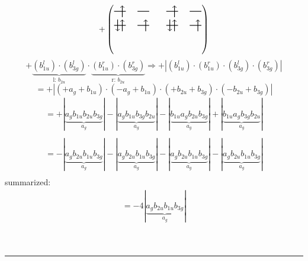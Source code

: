 \documentclass{article}
\begin{document}
\[+\left(\begin{tikzpicture}
    \draw[thick] (0,0) -- (0.5,0); %
    \draw[thick] (1,0) -- (1.5,0); %
    \draw[thick] (0,-0.6) -- (0.5,-0.6); %
    \draw[thick] (1,-0.6) -- (1.5,-0.6); %
\draw[->, thick] (0.35, -0.25) -- (0.35, 0.25); 
\draw[-> , thick] (0.35, -0.85) -- (0.35, -0.35); 
\draw[<- , thick] (0.15, -0.85) -- (0.15, -0.35); 
 \draw[-> , thick] (1.35, -0.85) -- (1.35, -0.35); 
\end{tikzpicture}\qquad \begin{tikzpicture}
    \draw[thick] (0,0) -- (0.5,0); %
    \draw[thick] (1,0) -- (1.5,0); %
    \draw[thick] (0,-0.6) -- (0.5,-0.6); %
    \draw[thick] (1,-0.6) -- (1.5,-0.6); %
\draw[->, thick] (0.35, -0.25) -- (0.35, 0.25); 
\draw[-> , thick] (0.35, -0.85) -- (0.35, -0.35); 
\draw[<- , thick] (0.15, -0.85) -- (0.15, -0.35); 
 \draw[-> , thick] (1.35, -0.85) -- (1.35, -0.35); 
\end{tikzpicture}\right)\]$$+ \underbrace{(b_{1u}^{l})\cdot (b_{3g}^{l})}_{\text{l: }b_{2u}}\cdot \underbrace{(b_{1u}^{r})\cdot (b_{3g}^{r})}_{\text{r: }b_{2u}}\Rightarrow +\left|(b_{1u}^{l}) \cdot (b_{1u}^{r}) \cdot (b_{3g}^{l}) \cdot (b_{3g}^{r})\right|$$$$=+\left|(+a_{g}+b_{1u}) \cdot (-a_{g}+b_{1u}) \cdot (+b_{2u}+b_{3g}) \cdot (-b_{2u}+b_{3g})\right|$$\begin{multline*}
=+\left|\underbrace{a_{g} b_{1u} b_{2u} b_{3g}}_{a_{g}}\right|-\left|\underbrace{a_{g} b_{1u} b_{3g} b_{2u}}_{a_{g}}\right|-\left|\underbrace{b_{1u} a_{g} b_{2u} b_{3g}}_{a_{g}}\right|+\left|\underbrace{b_{1u} a_{g} b_{3g} b_{2u}}_{a_{g}}\right|\\
\end{multline*}\begin{multline*}
=-\left|\underbrace{a_{g} b_{2u} b_{1u} b_{3g}}_{a_{g}}\right|-\left|\underbrace{a_{g} b_{2u} b_{1u} b_{3g}}_{a_{g}}\right|-\left|\underbrace{a_{g} b_{2u} b_{1u} b_{3g}}_{a_{g}}\right|-\left|\underbrace{a_{g} b_{2u} b_{1u} b_{3g}}_{a_{g}}\right|\\
\end{multline*}summarized:\begin{multline*}
=-4\left|\underbrace{a_{g} b_{2u} b_{1u} b_{3g}}_{a_{g}}\right|
\end{multline*}\\ \\
\hrule\newpage 
\end{document}
